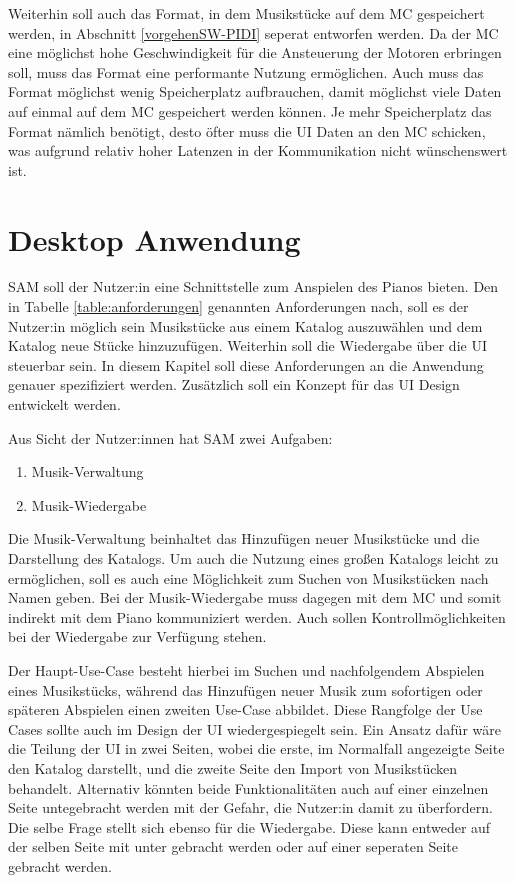 Weiterhin soll auch das Format, in dem Musikstücke auf dem \ac{MC} gespeichert werden, in Abschnitt \ref{vorgehenSW-PIDI} seperat entworfen werden.
Da der \ac{MC} eine möglichst hohe Geschwindigkeit für die Ansteuerung der Motoren erbringen soll, muss das Format eine performante Nutzung ermöglichen.
Auch muss das Format möglichst wenig Speicherplatz aufbrauchen, damit möglichst viele Daten auf einmal auf dem \ac{MC} gespeichert werden können.
Je mehr Speicherplatz das Format nämlich benötigt, desto öfter muss die \ac{UI} Daten an den \ac{MC} schicken, was aufgrund relativ hoher Latenzen in der Kommunikation nicht wünschenswert ist.


\section{Desktop Anwendung} \label{vorgehenSW-UI}

\ac{SAM} soll der Nutzer:in eine Schnittstelle zum Anspielen des Pianos bieten.
Den in Tabelle \ref{table:anforderungen} genannten Anforderungen nach, soll es der Nutzer:in möglich sein Musikstücke aus einem Katalog auszuwählen und dem Katalog neue Stücke hinzuzufügen.
Weiterhin soll die Wiedergabe über die \ac{UI} steuerbar sein.
In diesem Kapitel soll diese Anforderungen an die Anwendung genauer spezifiziert werden.
Zusätzlich soll ein Konzept für das \ac{UI} Design entwickelt werden.

Aus Sicht der Nutzer:innen hat \ac{SAM} zwei Aufgaben:
\begin{enumerate}
    \item Musik-Verwaltung
    \item Musik-Wiedergabe
\end{enumerate}

Die Musik-Verwaltung beinhaltet das Hinzufügen neuer Musikstücke und die Darstellung des Katalogs.
Um auch die Nutzung eines großen Katalogs leicht zu ermöglichen, soll es auch eine Möglichkeit zum Suchen von Musikstücken nach Namen geben.
Bei der Musik-Wiedergabe muss dagegen mit dem \ac{MC} und somit indirekt mit dem Piano kommuniziert werden.
Auch sollen Kontrollmöglichkeiten bei der Wiedergabe zur Verfügung stehen.

Der Haupt-Use-Case besteht hierbei im Suchen und nachfolgendem Abspielen eines Musikstücks, während das Hinzufügen neuer Musik zum sofortigen oder späteren Abspielen einen zweiten Use-Case abbildet.
Diese Rangfolge der Use Cases sollte auch im Design der \ac{UI} wiedergespiegelt sein.
Ein Ansatz dafür wäre die Teilung der \ac{UI} in zwei Seiten, wobei die erste, im Normalfall angezeigte Seite den Katalog darstellt, und die zweite Seite den Import von Musikstücken behandelt.
Alternativ könnten beide Funktionalitäten auch auf einer einzelnen Seite untegebracht werden mit der Gefahr, die Nutzer:in damit zu überfordern.
Die selbe Frage stellt sich ebenso für die Wiedergabe.
Diese kann entweder auf der selben Seite mit unter gebracht werden oder auf einer seperaten Seite gebracht werden.

